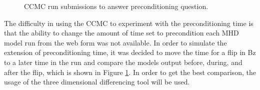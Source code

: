 \begin{figure}
	\centering
	\caption{CCMC run submissions to answer preconditioning question.}
	\label{fig:preconditioning}
	\figSpace
\end{figure}

The difficulty in using the CCMC to experiment with the preconditioning time is
that the ability to change the amount of time set to precondition each MHD model
run from the web form was not available. In order to simulate the extension of
preconditioning time, it was decided to move the time for a flip in Bz to a
later time in the run and compare the models output before, during, and after the
flip, which is shown in Figure \ref{fig:preconditioning}. In order to get the
best comparison, the usage of the three dimensional differencing tool will be used.

